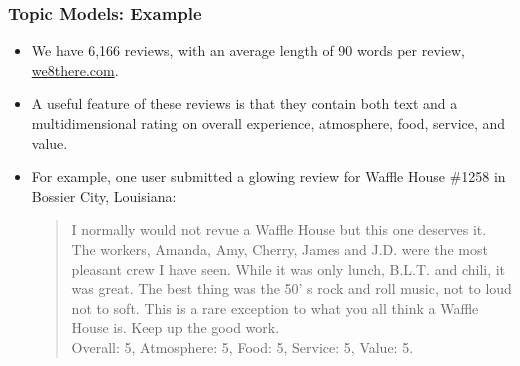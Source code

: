 \documentclass[
  shownotes,
  xcolor={svgnames},
  hyperref={colorlinks,citecolor=DarkBlue,linkcolor=DarkRed,urlcolor=DarkBlue}
  , aspectratio=169]{beamer}
\begin{document}
\begin{frame}
\frametitle{Topic Models: Example}

\begin{itemize}


\item We have 6,166 reviews, with an average length of 90 words per review, \url{we8there.com}. 
\medskip
\item A useful feature of these reviews is that they contain both text and a multidimensional rating on overall experience, atmosphere, food, service, and value. 
\medskip
\item For example, one user submitted a glowing review for Waffle House \#1258 in Bossier City, Louisiana: 
\medskip

\begin{quote}
I normally would not revue a Waffle House but this one deserves it. The workers, Amanda, Amy, Cherry, James and J.D. were the most pleasant crew I have seen. While it was only lunch, B.L.T. and chili, it was great. The best thing was the 50’ s rock and roll music, not to loud not to soft. This is a rare exception to what you all think a Waffle House is. Keep up the good work. \\
Overall: 5, Atmosphere: 5, Food: 5, Service: 5, Value: 5.  
 \end{quote} 


\end{itemize}
\end{frame}
\end{document}
